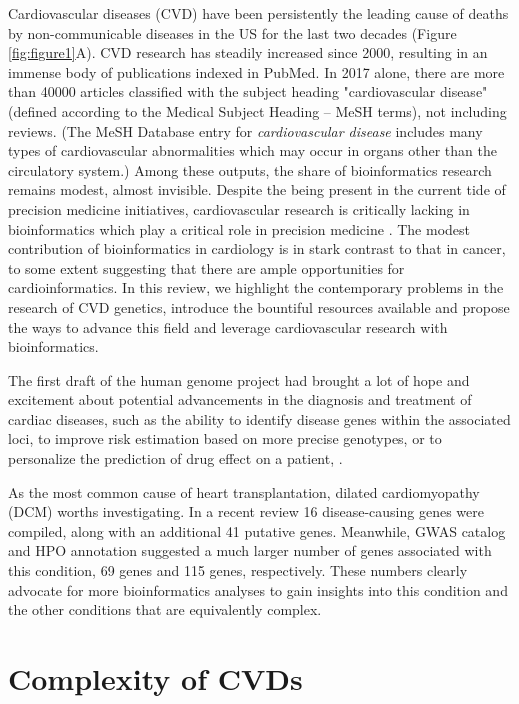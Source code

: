 \documentclass[letter]{bioinfo}
\begin{document}
Cardiovascular diseases (CVD) have been persistently the leading cause of deaths by non-communicable diseases in the US for the last two decades (Figure \ref{fig:figure1}A). CVD research has steadily increased since 2000, resulting in an immense body of publications indexed in PubMed. In 2017 alone, there are more than 40000 articles classified with the subject heading "cardiovascular disease" (defined according to the Medical Subject Heading -- MeSH terms), not including reviews. (The MeSH Database entry for \textit{cardiovascular disease} includes many types of cardiovascular abnormalities which may occur in organs other than the circulatory system.) Among these outputs, the share of bioinformatics research remains modest, almost invisible. Despite the being present in the current tide of precision medicine initiatives, cardiovascular research is critically lacking in bioinformatics which play a critical role in precision medicine \citep{Gomez-Lopez:2017:Precision}.  The modest contribution of bioinformatics in cardiology is in stark contrast to that in cancer, to some extent suggesting that there are ample opportunities for cardioinformatics. In this review, we highlight the contemporary problems in the research of CVD genetics, introduce the bountiful resources available and propose the ways to advance this field and leverage cardiovascular research with bioinformatics.

The first draft of the human genome project had brought a lot of hope and excitement about potential advancements in the diagnosis and treatment of cardiac diseases, such as the ability to identify disease genes within the associated loci, to improve risk estimation based on more precise genotypes, or to personalize the prediction of drug effect on a patient, \citep{Komajda:2001:heart}.


As the most common cause of heart transplantation, dilated cardiomyopathy (DCM) worths investigating. In a recent review \citep{Burke:2016:Clinical} 16 disease-causing genes were compiled, along with an additional 41 putative genes. Meanwhile, GWAS catalog and HPO annotation suggested a much larger number of genes associated with this condition, 69 genes and 115 genes, respectively. These numbers clearly advocate for more bioinformatics analyses to gain insights into this condition and the other conditions that are equivalently complex.

\section{Complexity of CVDs}
\end{document}
